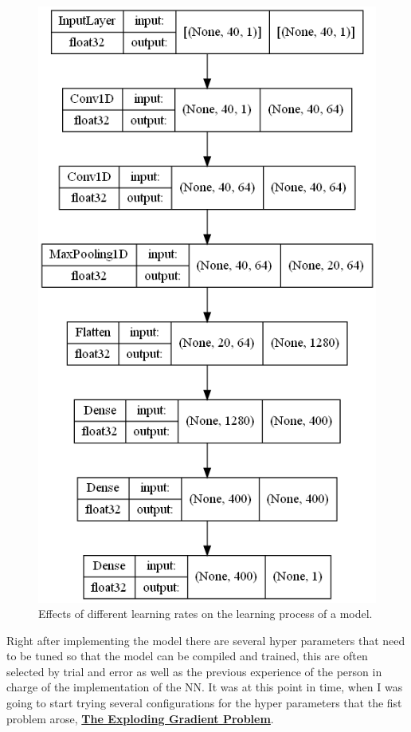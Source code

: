 \documentclass[12pt, a4paper]{article}
\begin{document}
	\begin{figure}[H]
		\centering
		\label{bigM1Squema}
		\includegraphics[scale=0.50]{img/esquemaPequenoM1.png}
		\caption{Effects of different learning rates on the learning process of a model. \cite{learningRates}}
	\end{figure}
	
	Right after implementing the model there are several hyper parameters that need to be tuned so that the model can be compiled and trained, this are often selected by trial and error as well as the previous experience of the person in charge of the implementation of the NN. It was at this point in time, when I was going to start trying several configurations for the hyper parameters that the fist problem arose, \hyperref[sec:explodingGradientProblem]{\textbf{The Exploding Gradient Problem}}.
	
\end{document}
